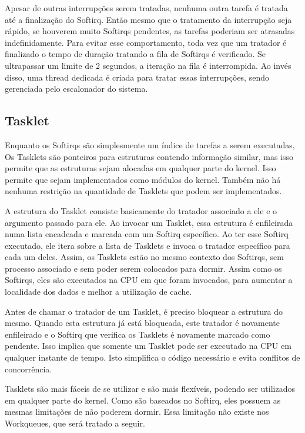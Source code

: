 Apesar de outras interrupções serem tratadas, nenhuma outra tarefa é tratada até a finalização do Softirq. Então mesmo que o tratamento da interrupção seja rápido, se houverem muito Softirqs pendentes, as tarefas poderiam ser atrasadas indefinidamente. Para evitar esse comportamento, toda vez que um tratador é finalizado o tempo de duração tratando a fila de Softirqs é verificado. Se ultrapassar um limite de 2 segundos, a iteração na fila é interrompida. Ao invés disso, uma thread dedicada é criada para tratar essas interrupções, sendo gerenciada pelo escalonador do sistema.

\subsection{Tasklet}

Enquanto os Softirqs são simplesmente um índice de tarefas a serem executadas, Os Tasklets são ponteiros para estruturas contendo informação similar, mas isso permite que as estruturas sejam alocadas em qualquer parte do kernel. Isso permite que sejam implementados como módulos do kernel. Também não há nenhuma restrição na quantidade de Tasklets que podem ser implementados.

A estrutura do Tasklet consiste basicamente do tratador associado a ele e o argumento passado para ele. Ao invocar um Tasklet, essa estrutura é enfileirada numa lista encadeada e marcada com um Softirq específico. Ao ter esse Softirq executado, ele itera sobre a lista de Tasklets e invoca o tratador específico para cada um deles. Assim, os Tasklets estão no mesmo contexto dos Softirqs, sem processo associado e sem poder serem colocados para dormir. Assim como os Softirqs, eles são executados na CPU em que foram invocados, para aumentar a localidade dos dados e melhor a utilização de cache.

Antes de chamar o tratador de um Tasklet, é preciso bloquear a estrutura do mesmo. Quando esta estrutura já está bloqueada, este tratador é novamente enfileirado e o Softirq que verifica os Tasklets é novamente marcado como pendente. Isso implica que somente um Tasklet pode ser executado na CPU em qualquer instante de tempo. Isto simplifica o código necessário e evita conflitos de concorrência.

Tasklets são mais fáceis de se utilizar e são mais flexíveis, podendo ser utilizados em qualquer parte do kernel. Como são baseados no Softirq, eles possuem as mesmas limitações de não poderem dormir. Essa limitação não existe nos Workqueues, que será tratado a seguir.

